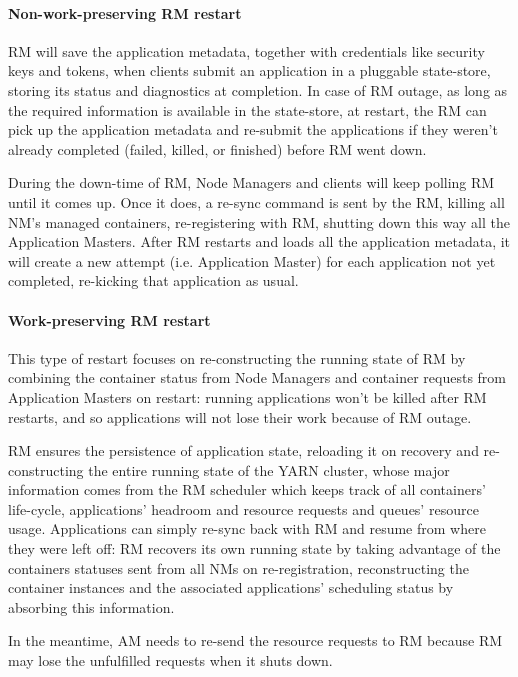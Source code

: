 \paragraph{Non-work-preserving RM restart} RM will save the application metadata, together with credentials like security keys and tokens, when clients submit an application in a pluggable state-store, storing its status and diagnostics at completion. In case of RM outage, as long as the required information is available in the state-store, at restart, the RM can pick up the application metadata and re-submit the applications if they weren't already completed (failed, killed, or finished) before RM went down.

During the down-time of RM, Node Managers and clients will keep polling RM until it comes up. Once it does, a re-sync command is sent by the RM, killing all NM's managed containers, re-registering with RM, shutting down this way all the Application Masters. After RM restarts and loads all the application metadata, it will create a new attempt (i.e. Application Master) for each application not yet completed, re-kicking that application as usual.

\paragraph{Work-preserving RM restart} This type of restart focuses on re-constructing the running state of RM by combining the container status from Node Managers and container requests from Application Masters on restart: running applications won't be killed after RM restarts, and so applications will not lose their work because of RM outage. 

RM ensures the persistence of application state, reloading it on recovery and re-constructing the entire running state of the YARN cluster, whose major information comes from the RM scheduler which keeps track of all containers' life-cycle, applications' headroom and resource requests and queues' resource usage. 
Applications can simply re-sync back with RM and resume from where they were left off: RM recovers its own running state by taking advantage of the containers statuses sent from all NMs on re-registration, reconstructing the container instances and the associated applications' scheduling status by absorbing this information. 

In the meantime, AM needs to re-send the resource requests to RM because RM may lose the unfulfilled requests when it shuts down.

